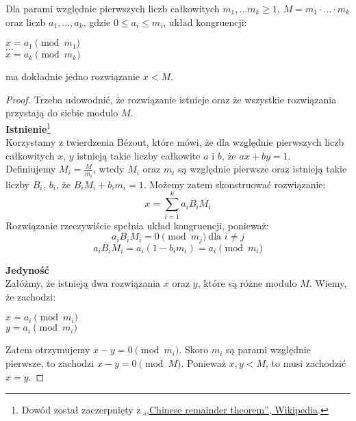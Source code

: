 \begin{theorem}
    Dla parami względnie pierwszych liczb całkowitych \( m_1, \dots m_k \geq 1 \), \( M = m_1 \cdot \ldots \cdot m_k \) oraz liczb \( a_1, \ldots, a_k \), gdzie \( 0 \leq a_i \leq m_i \), układ kongruencji:
    \begin{center}
        \( x = a_1 \pmod{m_1} \) \\
        \( \dots \) \\
        \( x = a_k \pmod{m_k} \)
    \end{center}
    ma dokładnie jedno rozwiązanie \( x < M \).
\end{theorem}
\begin{proof}
    Trzeba udowodnić, że rozwiązanie istnieje oraz że wszystkie rozwiązania przystają do siebie modulo \( M \). \\
    \textbf{Istnienie}\footnote{Dowód został zaczerpnięty z \href{https://en.wikipedia.org/wiki/Chinese_remainder_theorem#Proof}{,,Chinese remainder theorem'', Wikipedia}.} \\
    Korzystamy z twierdzenia B\'ezout, które mówi, że dla względnie pierwszych liczb całkowitych \( x \), \( y \) istnieją takie liczby całkowite \( a \) i \( b \), że \( ax + by = 1 \). \\
    Definiujemy \( M_i = \frac{M}{m_i} \), wtedy \( M_i \) oraz \( m_i \) są względnie pierwsze oraz istnieją takie liczby \( B_i, \ b_i \), że \( B_iM_i + b_im_i = 1 \).
    Możemy zatem skonstruować rozwiązanie:
    \[
        x = \sum_{i=1}^{k} a_iB_iM_i
    \]
    Rozwiązanie rzeczywiście spełnia układ kongruencji, ponieważ:
    \[
        a_iB_iM_i = 0 \pmod{m_j} \ \text{dla } i \neq j
    \]
    \[
        a_iB_iM_i = a_i(1 - b_im_i) = a_i \pmod{m_i}
    \]

    \textbf{Jedyność} \\
    Załóżmy, że istnieją dwa rozwiązania \( x \) oraz \( y \), które są różne modulo \( M \). Wiemy, że zachodzi:
    \begin{center}
        \( x = a_i \pmod{m_i} \) \\
        \( y = a_i \pmod{m_i} \)
    \end{center}
    Zatem otrzymujemy \( x-y = 0 \pmod{m_i} \). Skoro \( m_i \) są parami względnie pierwsze, to zachodzi \(  x-y = 0 \pmod{M} \).
    Ponieważ \( x, y < M \), to musi zachodzić \( x = y \).
\end{proof}